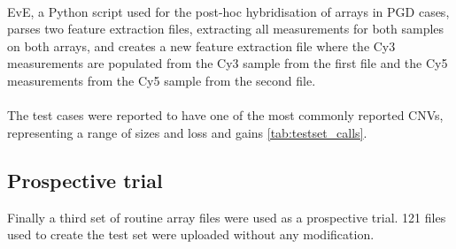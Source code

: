 \paragraph*{}
EvE, a Python script used for the post-hoc hybridisation of arrays in \ac{PGD} cases, parses two feature extraction files, extracting all measurements for both samples on both arrays, and creates a new feature extraction file where the Cy3 measurements are populated from the Cy3 sample from the first file and the Cy5 measurements from the Cy5 sample from the second file.

\paragraph*{}
The test cases were reported to have one of the most commonly reported CNVs, representing a range of sizes and loss and gains \ref{tab:testset_calls}.

\begin{table}
\caption{Cases with one of the 9 most common CNV were used to create the test set}
\label{tab:testset_calls}
\end{table}

\subsection{Prospective trial}
Finally a third set of routine array files were used as a prospective trial. 
121 files used to create the test set were uploaded without any modification.

